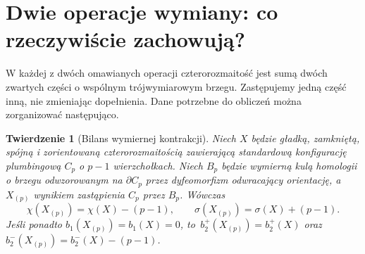 \documentclass[11pt,a4paper]{report}
\numberwithin{equation}{section}
\theoremstyle{plain}
\newtheorem{twierdzenie}{Twierdzenie}[section]
\theoremstyle{definition}
\theoremstyle{remark}
\begin{document}
\section{Dwie operacje wymiany: co rzeczywiście zachowują?}
\label{sec:tg-syn-exchange}

W każdej z dwóch omawianych operacji czterorozmaitość
jest sumą dwóch zwartych części o wspólnym trójwymiarowym
brzegu. Zastępujemy jedną część inną, nie zmieniając dopełnienia.
Dane potrzebne do obliczeń można zorganizować następująco.

\begin{center}
\end{center}

\begin{twierdzenie}[Bilans wymiernej kontrakcji]
\label{thm:tg-syn-rational}
Niech $X$ będzie gładką, zamkniętą, spójną i zorientowaną
czterorozmaitością zawierającą standardową konfigurację
plumbingową $C_p$ o $p-1$ wierzchołkach. Niech $B_p$
będzie wymierną kulą homologii o brzegu odwzorowanym na
$\partial C_p$ przez dyfeomorfizm odwracający orientację,
a $X_{(p)}$ wynikiem zastąpienia $C_p$ przez $B_p$.
Wówczas
\[
 \chi(X_{(p)})=\chi(X)-(p-1),\qquad
 \sigma(X_{(p)})=\sigma(X)+(p-1).
\]
Jeśli ponadto $b_1(X_{(p)})=b_1(X)=0$, to
$\,b_2^+(X_{(p)})=b_2^+(X)$ oraz
$b_2^-(X_{(p)})=b_2^-(X)-(p-1)$.
\end{twierdzenie}
\end{document}
